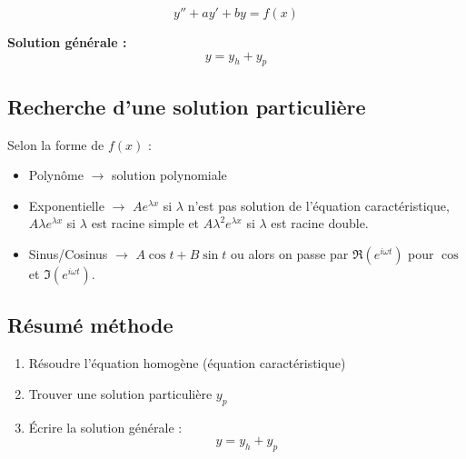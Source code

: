 \documentclass[a4paper,11pt]{article}
\begin{document}
                \[
                y'' + ay' + by = f(x)
                \]

                \textbf{Solution générale :}
                \[
                y = y_h + y_p
                \]

        \subsection*{Recherche d'une solution particulière}

            Selon la forme de $f(x)$ :

            \begin{itemize}
                \item Polynôme $\rightarrow$ solution polynomiale
                \item Exponentielle $\rightarrow$ $Ae^{\lambda x}$ si $\lambda$ n'est pas solution de l'équation caractéristique,
                $A\lambda e^{\lambda x}$ si $\lambda$ est racine simple et $A\lambda^2 e^{\lambda x}$ si $\lambda$ est racine double.
                \item Sinus/Cosinus $\rightarrow$ $A\cos t + B\sin t$ \quad ou alors on passe par $\Re \left( e^{i\omega t} \right)$ pour $\cos$ et $\Im \left( e^{i\omega t} \right)$.
            \end{itemize}


        \subsection*{Résumé méthode}

            \begin{enumerate}
                \item Résoudre l'équation homogène (équation caractéristique)
                \item Trouver une solution particulière $y_p$
                \item Écrire la solution générale :
                \[
                y = y_h + y_p
                \]
            \end{enumerate}
\end{document}
